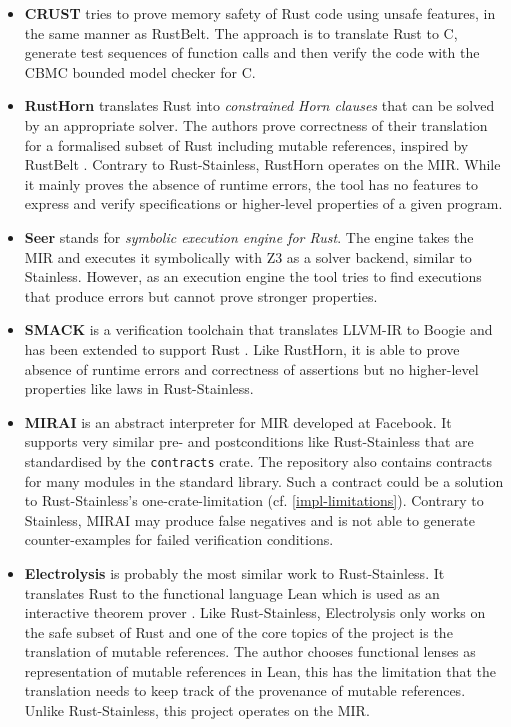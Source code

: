 \begin{itemize}

\item \textbf{CRUST} \cite{crust} tries to prove memory safety of Rust code
using unsafe features, in the same manner as RustBelt. The approach is to
translate Rust to C, generate test sequences of function calls and then verify
the code with the CBMC bounded model checker for C.

\item \textbf{RustHorn} \cite{rusthorn} translates Rust into \emph{constrained
Horn clauses} that can be solved by an appropriate solver. The authors prove
correctness of their translation for a formalised subset of Rust including
mutable references, inspired by RustBelt \cite{rustbelt}. Contrary to
Rust-Stainless, RustHorn operates on the MIR. While it mainly proves the absence
of runtime errors, the tool has no features to  express and verify
specifications or higher-level properties of a given program.

\item \textbf{Seer} \cite{seer} stands for \emph{symbolic execution engine for
Rust}. The engine takes the MIR and executes it symbolically with Z3 \cite{z3}
as a solver backend, similar to Stainless. However, as an execution engine the
tool tries to find executions that produce errors but cannot prove stronger
properties.

\item \textbf{SMACK} is a verification toolchain that translates LLVM-IR to
Boogie \cite{boogie} and  has been extended to support Rust \cite{smack}. Like
RustHorn, it is able to prove absence of runtime errors and correctness of
assertions but no higher-level properties like laws in Rust-Stainless.

\item \textbf{MIRAI} \cite{mirai} is an abstract interpreter for MIR developed
at Facebook. It supports very similar pre- and postconditions like
Rust-Stainless that are standardised by the \lstinline!contracts! crate. The
repository also contains contracts for many modules in the standard library.
Such a contract could be a solution to Rust-Stainless's one-crate-limitation (cf.
\autoref{impl-limitations}).  Contrary to Stainless, MIRAI may produce false
negatives and  is not able to generate counter-examples for failed verification
conditions.

\item \textbf{Electrolysis} \cite{electrolysis} is probably the most similar
work to Rust-Stainless. It translates Rust to the functional language Lean which
is used as an interactive theorem prover \cite{lean}. Like Rust-Stainless,
Electrolysis only works on the safe subset of Rust and one of the core topics of
the project is the translation of mutable references. The author chooses
functional lenses as representation of mutable references in Lean, this has the
limitation that the translation needs to keep track of the provenance of mutable
references. Unlike Rust-Stainless, this project operates on the MIR.



\end{itemize}
